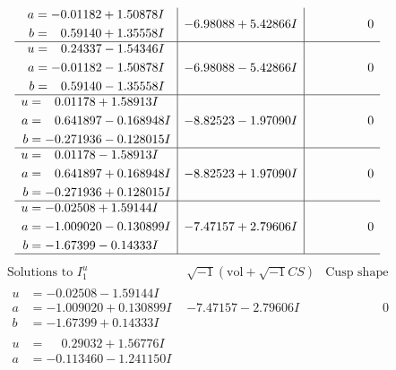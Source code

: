 \documentclass[1p]{elsarticle_modified}
\theoremstyle{definition}
\newcommand{\I}{\sqrt{-1}}
\begin{document}
$$\begin{array}{c|c|c}
\begin{aligned}
a &= -0.01182 + 1.50878 I \\
b &= \phantom{-}0.59140 + 1.35558 I\end{aligned}
 & -6.98088 + 5.42866 I & \phantom{-0.000000 } 0 \\ \hline\begin{aligned}
u &= \phantom{-}0.24337 - 1.54346 I \\
a &= -0.01182 - 1.50878 I \\
b &= \phantom{-}0.59140 - 1.35558 I\end{aligned}
 & -6.98088 - 5.42866 I & \phantom{-0.000000 } 0 \\ \hline\begin{aligned}
u &= \phantom{-}0.01178 + 1.58913 I \\
a &= \phantom{-}0.641897 - 0.168948 I \\
b &= -0.271936 - 0.128015 I\end{aligned}
 & -8.82523 - 1.97090 I & \phantom{-0.000000 } 0 \\ \hline\begin{aligned}
u &= \phantom{-}0.01178 - 1.58913 I \\
a &= \phantom{-}0.641897 + 0.168948 I \\
b &= -0.271936 + 0.128015 I\end{aligned}
 & -8.82523 + 1.97090 I & \phantom{-0.000000 } 0 \\ \hline\begin{aligned}
u &= -0.02508 + 1.59144 I \\
a &= -1.009020 - 0.130899 I \\
b &= -1.67399 - 0.14333 I\end{aligned}
 & -7.47157 + 2.79606 I & \phantom{-0.000000 } 0\\
 \hline 
 \end{array}$$\newpage$$\begin{array}{c|c|c}  
\text{Solutions to }I^u_{1}& \I (\text{vol} + \sqrt{-1}CS) & \text{Cusp shape}\\
 \hline 
\begin{aligned}
u &= -0.02508 - 1.59144 I \\
a &= -1.009020 + 0.130899 I \\
b &= -1.67399 + 0.14333 I\end{aligned}
 & -7.47157 - 2.79606 I & \phantom{-0.000000 } 0 \\ \hline\begin{aligned}
u &= \phantom{-}0.29032 + 1.56776 I \\
a &= -0.113460 - 1.241150 I \\

\end{aligned}
\end{array}$$
\end{document}

